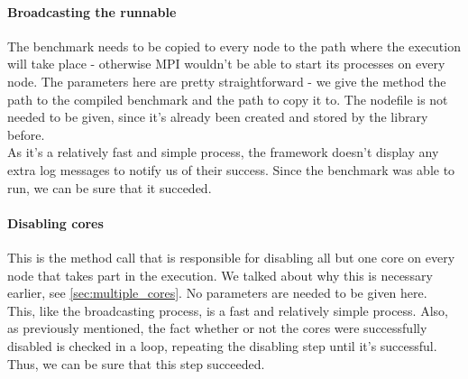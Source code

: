 \paragraph{Broadcasting the runnable}
The benchmark needs to be copied to every node to the path where the
execution will take place - otherwise MPI wouldn't be able to start
its processes on every node. The parameters here are pretty
straightforward - we give the method the path to the compiled
benchmark and the path to copy it to. The nodefile is not needed to be
given, since it's already been created and stored by the library
before.\\
As it's a relatively fast and simple process, the framework doesn't
display any extra log messages to notify us of their success. Since
the benchmark was able to run, we can be sure that it succeded.
\paragraph{Disabling cores}
This is the method call that is responsible for disabling all but one
core on every node that takes part in the execution. We talked about
why this is necessary earlier, see \ref{sec:multiple_cores}. No
parameters are needed to be given here.\\
This, like the broadcasting process, is a fast and relatively simple
process. Also, as previously mentioned, the fact whether or not the
cores were successfully disabled is checked in a loop, repeating the
disabling step until it's successful. Thus, we can be sure that this
step succeeded.

